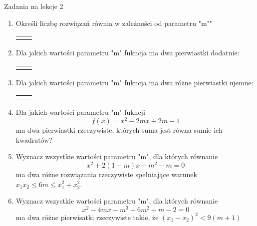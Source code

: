 \documentclass[12pt,a4paper]{article}
\begin{document}
	
	\begin{center}
		\LARGE Zadania na lekcje 2
	\end{center}
	\vspace{1.5cm}
	
	\begin{enumerate}[1.]
		\item Określi liczbę rozwiązań równia w zależności od parametru "m""
		\begin{enumerate}[a)] \begin{tabular}{p{7cm} p{7cm}} 
				\item $(m-3)x^2+(m-2)x+1=0$& \vspace{0.4cm} 	\item $(2m-3)x^2+4mx+m-1=0$ \\
		\end{tabular} \end{enumerate}
	
		\item Dla jakich wartości parametru "m" fukncja ma dwa pierwiastki dodatnie:
		\begin{enumerate}[a)] \begin{tabular}{p{7cm} p{7cm}} 
				\item $f(x)=x^2+2(m-1)x+2m+1$& \vspace{0.4cm} 	\item $f(x)=x^2+(m-5)x+m-2$ \\
		\end{tabular} \end{enumerate}
	
		\item Dla jakich wartości parametru "m" fukncja ma dwa różne pierwiastki ujemne:
		\begin{enumerate}[a)] \begin{tabular}{p{7cm} p{7cm}} 
				\item $f(x)=x^2+5mx+4m^2-3m$& \vspace{0.4cm} 	\item $f(x)=(m-2)x^2-2mx+m^2-3m+4$ \\
		\end{tabular} \end{enumerate}
	
		\item Dla jakich wartości parametru "m" fukncji
		$$f(x)=x^2-2mx+2m-1$$
		ma dwa pierwiastki rzeczywiste, których suma jest równa sumie ich kwadratów?
		
		\item Wyznacz wszystkie wartości parametru "m", dla których równanie
		$$x^2+2(1-m)x+m^2-m=0$$
		ma dwa różne rozwiązania rzeczywiste spełniające warunek $x_1x_2\leq 6m \leq x_1^2+x_2^2 $.
		
		\item Wyznacz wszystkie wartości parametru "m", dla których równanie
		$$x^2-4mx-m^3+6m^2+m-2=0$$
		ma dwa różne pierwisatki rzeczywiste takie, że $(x_1-x_2)^2<9(m+1)$
	\end{enumerate}
	
\end{document}
